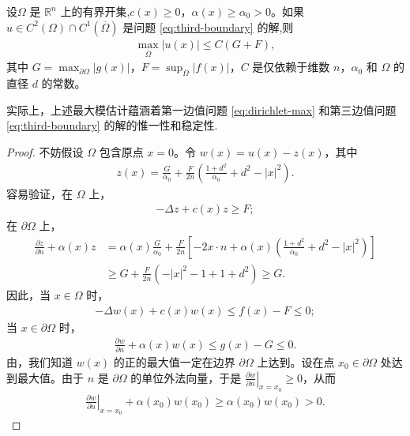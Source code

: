 \documentclass[../../main.tex]{subfiles}%
\begin{document}
\begin{theorem}\label{theorem:边值问题最大模估计11}
设$\Omega$ 是 $\mathbb{R}^n$ 上的有界开集,$c(x)\geqslant 0$，$\alpha(x)\geqslant \alpha_0>0$。如果 $u\in C^2(\Omega)\cap C^1(\overline{\Omega})$ 是问题 \eqref{eq:third-boundary} 的解,则
\begin{align*}
\max_{\overline{\Omega}} |u(x)| \leqslant C(G+F), 
\end{align*}
其中 $G=\max_{\partial\Omega}|g(x)|$，$F=\sup_{\Omega}|f(x)|$，$C$ 是仅依赖于维数 $n$，$\alpha_0$ 和 $\Omega$ 的直径 $d$ 的常数。
\end{theorem}
\begin{remark}
实际上，上述最大模估计蕴涵着第一边值问题 \eqref{eq:dirichlet-max} 和第三边值问题 \eqref{eq:third-boundary} 的解的惟一性和稳定性.
\end{remark}
\begin{proof}
不妨假设 $\Omega$ 包含原点 $x=0$。令 $w(x)=u(x)-z(x)$，其中
\begin{align*}
z(x) = \frac{G}{\alpha_0} + \frac{F}{2n}\left( \frac{1+d^2}{\alpha_0} + d^2 - |x|^2 \right).
\end{align*}
容易验证，在 $\Omega$ 上，
\begin{align*}
-\Delta z + c(x)z \geqslant F;
\end{align*}
在 $\partial\Omega$ 上，
\begin{align*}
\frac{\partial z}{\partial n} + \alpha(x)z
&= \alpha(x)\frac{G}{\alpha_0} + \frac{F}{2n}\left[ -2x\cdot n + \alpha(x)\left( \frac{1+d^2}{\alpha_0} + d^2 - |x|^2 \right) \right] \\
&\geqslant G + \frac{F}{2n}(-|x|^2 - 1 + 1 + d^2) \geqslant G.
\end{align*}
因此，当 $x\in\Omega$ 时，
\begin{align*}
-\Delta w(x) + c(x)w(x) \leqslant f(x) - F \leqslant 0;
\end{align*}
当 $x\in\partial\Omega$ 时，
\begin{align*}
\frac{\partial w}{\partial n} + \alpha(x)w(x) \leqslant g(x) - G \leqslant 0.
\end{align*}
由，我们知道 $w(x)$ 的正的最大值一定在边界 $\partial\Omega$ 上达到。设在点 $x_0\in\partial\Omega$ 处达到最大值。由于 $n$ 是 $\partial\Omega$ 的单位外法向量，于是 $\left.\frac{\partial w}{\partial n}\right|_{x=x_0}\geqslant 0$，从而
\begin{align*}
\left.\frac{\partial w}{\partial n}\right|_{x=x_0} + \alpha(x_0)w(x_0) \geqslant \alpha(x_0)w(x_0) > 0.
\end{align*}

\end{proof}
\end{document}
